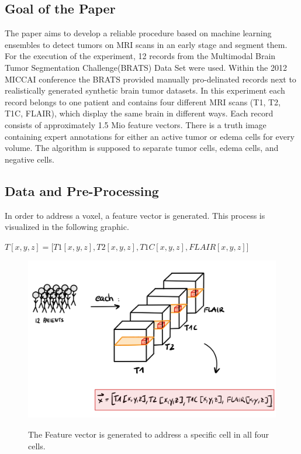\documentclass[
12pt,
headsepline,
bibliography=totoc,
twoside=semi,
fleqn
]{scrartcl}
\begin{document}
 \subsection{Goal of the Paper\label{sec:sec3-1}}
 The paper aims to develop a reliable procedure based on machine learning ensembles to detect tumors on MRI scans in an early stage and segment them. For the execution of the experiment, 12 records from the Multimodal Brain Tumor Segmentation Challenge(BRATS) Data Set were used. Within the 2012 MICCAI conference the BRATS provided manually pro-delinated records next to realistically generated synthetic brain tumor datasets. In this experiment each record belongs to one patient and contains four different MRI scans (T1, T2, T1C, FLAIR), which display the same brain in different ways. Each record consists of approximately 1.5 Mio feature vectors. There is a truth image containing expert annotations for either an active tumor or edema cells for every volume. The algorithm is supposed to separate tumor cells, edema cells, and negative cells.

 \subsection{Data and Pre-Processing\label{sec:sec3-2}}
 In order to address a voxel, a feature vector is generated. This process is visualized in the following graphic.\\
 
 \begin{center} $T[x,y,z] = \biggl[T1[x,y,z], T2[x,y,z], T1C[x,y,z], FLAIR[x,y,z]\biggr]$\end{center}

 \begin{figure}[H]
 \centering \includegraphics[scale=0.6]{BDT14.png}\label{fig:fig14}
 \caption{The Feature vector is generated to address a specific cell in all four cells.}
 \end{figure}
\end{document}
